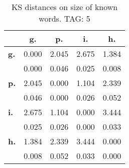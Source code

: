 \begin{table}[h!]
\begin{center}
\begin{tabular}{| l || c | c | c | c |}\hline
 & {\bf g.} & {\bf p.} & {\bf i.} & {\bf h.} \\\hline\hline
{\bf g.} & 0.000 & 2.045 & 2.675 & 1.384 \\
{\bf } & 0.000 & 0.046 & 0.025 & 0.008 \\\hline
{\bf p.} & 2.045 & 0.000 & 1.104 & 2.339 \\
{\bf } & 0.046 & 0.000 & 0.026 & 0.052 \\\hline
{\bf i.} & 2.675 & 1.104 & 0.000 & 3.444 \\
{\bf } & 0.025 & 0.026 & 0.000 & 0.033 \\\hline
{\bf h.} & 1.384 & 2.339 & 3.444 & 0.000 \\
{\bf } & 0.008 & 0.052 & 0.033 & 0.000 \\\hline
\end{tabular}
\caption{KS distances on size of known words. TAG: 5}
\end{center}
\end{table}